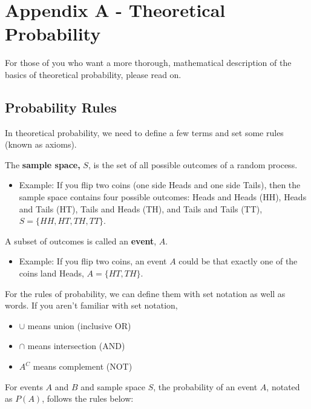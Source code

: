 \documentclass[]{book}
\providecommand{\tightlist}{%
  \setlength{\itemsep}{0pt}\setlength{\parskip}{0pt}}
\begin{document}
\hypertarget{appendix-a---theoretical-probability}{%
\chapter{Appendix A - Theoretical Probability}\label{appendix-a---theoretical-probability}}

For those of you who want a more thorough, mathematical description of the basics of theoretical probability, please read on.

\hypertarget{probability-rules}{%
\section{Probability Rules}\label{probability-rules}}

In theoretical probability, we need to define a few terms and set some rules (known as axioms).

The \textbf{sample space,} \(S\), is the set of all possible outcomes of a random process.

\begin{itemize}
\tightlist
\item
  Example: If you flip two coins (one side Heads and one side Tails), then the sample space contains four possible outcomes: Heads and Heads (HH), Heads and Tails (HT), Tails and Heads (TH), and Tails and Tails (TT), \(S = \{HH,HT,TH,TT\}\).
\end{itemize}

A subset of outcomes is called an \textbf{event}, \(A\).

\begin{itemize}
\tightlist
\item
  Example: If you flip two coins, an event \(A\) could be that exactly one of the coins land Heads, \(A = \{HT,TH\}\).
\end{itemize}

For the rules of probability, we can define them with set notation as well as words. If you aren't familiar with set notation,

\begin{itemize}
\tightlist
\item
  \(\cup\) means union (inclusive OR)
\item
  \(\cap\) means intersection (AND)
\item
  \(A^C\) means complement (NOT)
\end{itemize}

For events \(A\) and \(B\) and sample space \(S\), the probability of an event \(A\), notated as \(P(A)\), follows the rules below:
\end{document}
